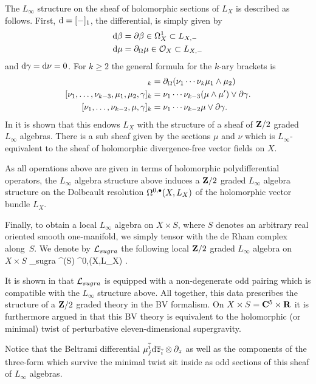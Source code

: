 The $L_\infty$ structure on the sheaf of holomorphic sections of $L_X$ is described as follows. 
First, ${\rm d} = [-]_1$, the differential, is simply given by 
\begin{align*}
{\rm d} \beta & = \partial \beta \in \Omega^1_X \subset L_{X,-} \\
{\rm d} \mu & = \partial_{\Omega} \mu \in \mathcal O_X \subset L_{X, -}
\end{align*}
and ${\rm d} \gamma = {\rm d} \nu = 0$. 
For $k \geq 2$ the general formula for the $k$-ary brackets is 
\begin{align*}
[\nu_1, \ldots, \nu_{k-2}, \mu_1,\mu_2]_{k} & = \div(\nu_1 \cdots \nu_k \mu_1 \wedge \mu_2) \\
[\nu_1,\ldots, \nu_{k-3}, \mu_1,\mu_2,\gamma]_k & = \nu_1 \cdots \nu_{k-3} (\mu \wedge \mu') \vee \del \gamma .\\
[\nu_1,\ldots,\nu_{k-2}, \mu, \gamma]_k & = \nu_1 \cdots \nu_{k-2} \mu \vee \del \gamma .
\end{align*}
In \cite{RSW} it is shown that this endows $L_{X}$ with the structure of a sheaf of $\mathbf{Z}/2$ graded $L_\infty$ algebras.
There is a sub sheaf given by the sections $\mu$ and $\nu$ which is $L_\infty$-equivalent to the sheaf of holomorphic divergence-free vector fields on $X$. 

As all operations above are given in terms of holomorphic polydifferential operators, the $L_\infty$ algebra structure above induces a $\mathbf{Z}/2$ graded $L_\infty$ algebra structure on the Dolbeault resolution $\Omega^{0,\bullet}(X,L_X)$ of the holomorphic vector bundle $L_X$.

Finally, to obtain a local $L_\infty$ algebra on $X \times S$, where $S$ denotes an arbitrary real oriented smooth one-manifold, we simply tensor with the de Rham complex along~$S$.
We denote by $\mathcal L_{sugra}$ the following local $\mathbf{Z}/2$ graded $L_\infty$ algebra on $X \times S$
\beqn
\cL_{sugra}  \Omega^\bu(S) \hotimes \Omega^{0,\bu}(X,L_X) .
\eeqn

\parsec[s:rsw]
It is shown in \cite{RSW} that $\mathcal L_{sugra}$ is equipped with a non-degenerate odd pairing which is compatible with the $L_\infty$ structure above. 
All together, this data prescribes the structure of a $\mathbf{Z}/2$ graded theory in the BV formalism. 
On $X \times S = \mathbf{C}^5 \times \mathbf{R}$ it is furthermore argued in \cite{RSW} that this BV theory is equivalent to the holomorphic (or minimal) twist of perturbative eleven-dimensional supergravity. 

Notice that the Beltrami differential $\mu^{\overline{i}}_j {\rm d} \overline{z}_{\overline{i}} \otimes \partial_z$ as well as the components of the three-form which survive the minimal twist sit inside as odd sections of this sheaf of $L_\infty$ algebras. 


